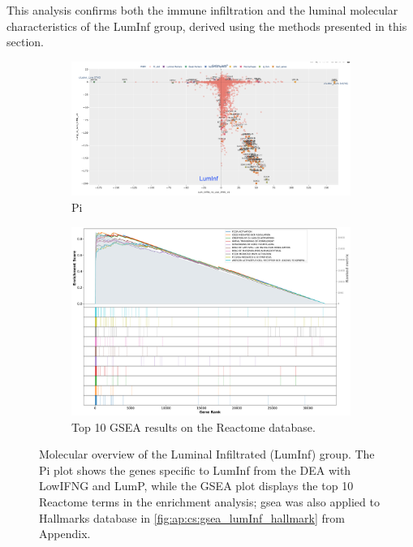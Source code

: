 This analysis confirms both the immune infiltration and the luminal molecular characteristics of the LumInf group, derived using the methods presented in this section.

\begin{figure}[H]
    \centering
    \begin{subfigure}[!t]{1.0\textwidth}
        \includegraphics[width=\textwidth,keepaspectratio]{Sections/ClusteringAnalysis/Resources/discussion/other_groups/lumInf_pi.png}    
        \caption{Pi}
        \label{fig:cs:lumInf_pi}
    \end{subfigure}
    \centering
    \begin{subfigure}[!t]{0.9\textwidth}
        \includegraphics[width=\textwidth, keepaspectratio]{Sections/ClusteringAnalysis/Resources/discussion/other_groups/lumInf_reactome_10_top.png}
        \caption{Top 10 GSEA results on the Reactome database.}
        \label{fig:cs:lumInf_gsea}
    \end{subfigure} 
    \centering
    \caption{Molecular overview of the Luminal Infiltrated (LumInf) group. The Pi plot shows the genes specific to LumInf from the DEA with LowIFNG and LumP, while the GSEA plot displays the top 10 Reactome terms in the enrichment analysis; \acrshort{gsea} was also applied to Hallmarks database in \cref{fig:ap:cs:gsea_lumInf_hallmark} from Appendix.} 
    \label{fig:cs:lumInf}
\end{figure}



